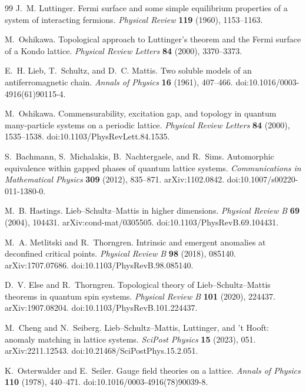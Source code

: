 \begin{thebibliography}{99}
J.~M. Luttinger.
Fermi surface and some simple equilibrium properties of a system of interacting
fermions.
\emph{Physical Review} \textbf{119} (1960), 1153--1163.

M.~Oshikawa.
Topological approach to Luttinger's theorem and the Fermi surface of a Kondo
lattice.
\emph{Physical Review Letters} \textbf{84} (2000), 3370--3373.

E.~H. Lieb, T.~Schultz, and D.~C. Mattis.
Two soluble models of an antiferromagnetic chain.
\emph{Annals of Physics} \textbf{16} (1961), 407--466.
doi:10.1016/0003-4916(61)90115-4.

M.~Oshikawa.
Commensurability, excitation gap, and topology in quantum many-particle systems
on a periodic lattice.
\emph{Physical Review Letters} \textbf{84} (2000), 1535--1538.
doi:10.1103/PhysRevLett.84.1535.

S.~Bachmann, S.~Michalakis, B.~Nachtergaele, and R.~Sims.
Automorphic equivalence within gapped phases of quantum lattice systems.
\emph{Communications in Mathematical Physics} \textbf{309} (2012), 835--871.
arXiv:1102.0842.
doi:10.1007/s00220-011-1380-0.

M.~B. Hastings.
Lieb--Schultz--Mattis in higher dimensions.
\emph{Physical Review B} \textbf{69} (2004), 104431.
arXiv:cond-mat/0305505.
doi:10.1103/PhysRevB.69.104431.

M.~A. Metlitski and R.~Thorngren.
Intrinsic and emergent anomalies at deconfined critical points.
\emph{Physical Review B} \textbf{98} (2018), 085140.
arXiv:1707.07686.
doi:10.1103/PhysRevB.98.085140.

D.~V. Else and R.~Thorngren.
Topological theory of Lieb--Schultz--Mattis theorems in quantum spin systems.
\emph{Physical Review B} \textbf{101} (2020), 224437.
arXiv:1907.08204.
doi:10.1103/PhysRevB.101.224437.

M.~Cheng and N.~Seiberg.
Lieb--Schultz--Mattis, Luttinger, and 't Hooft: anomaly matching in lattice
systems.
\emph{SciPost Physics} \textbf{15} (2023), 051.
arXiv:2211.12543.
doi:10.21468/SciPostPhys.15.2.051.

K.~Osterwalder and E.~Seiler.
Gauge field theories on a lattice.
\emph{Annals of Physics} \textbf{110} (1978), 440--471.
doi:10.1016/0003-4916(78)90039-8.


\end{thebibliography}
